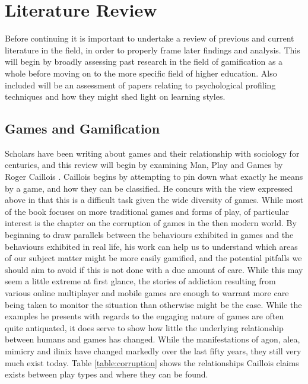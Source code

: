 \documentclass[12pt,a4paper,twoside]{report}
\begin{document}
\chapter{Literature Review}
Before continuing it is important to undertake a review of previous and current literature in the field, in order to properly frame later findings and analysis. This will begin by broadly assessing past research in the field of gamification as a whole before moving on to the more specific field of higher education. Also included will be an assessment of papers relating to psychological profiling techniques and how they might shed light on learning styles.

\section{Games and Gamification}
Scholars have been writing about games and their relationship with sociology for centuries, and this review will begin by examining Man, Play and Games by Roger Caillois \cite{caillois1961man}. Caillois begins by attempting to pin down what exactly he means by a game, and how they can be classified. He concurs with the view expressed above in that this is a difficult task given the wide diversity of games. While most of the book focuses on more traditional games and forms of play, of particular interest is the chapter on the corruption of games in the then modern world. By beginning to draw parallels between the behaviours exhibited in games and the behaviours exhibited in real life, his work can help us to understand which areas of our subject matter might be more easily gamified, and the potential pitfalls we should aim to avoid if this is not done with a due amount of care. While this may seem a little extreme at first glance, the stories of addiction resulting from various online multiplayer and mobile games are enough to warrant more care being taken to monitor the situation than otherwise might be the case. While the examples he presents with regards to the engaging nature of games are often quite antiquated, it does serve to show how little the underlying relationship between humans and games has changed. While the manifestations of agon, alea, mimicry and ilinix have changed markedly over the last fifty years, they still very much exist today. Table \ref{table:corruption} shows the relationships Caillois claims exists between play types and where they can be found.
\end{document}
